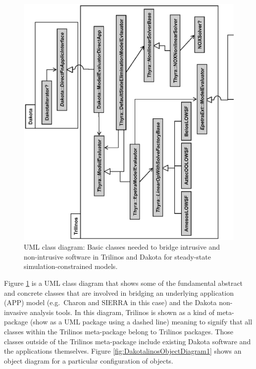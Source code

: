 \documentclass[pdf,ps2pdf,11pt]{SANDreport}
\begin{document}
{\bsinglespace
\begin{figure}
\begin{center}
\includegraphics*[angle=270,scale=0.75
]{DakotalinosClassDiagram}
\end{center}
\caption{
\label{fig:DakotalinosClassDiagram}
UML class diagram: Basic classes needed to bridge intrusive and non-intrusive
software in Trilinos and Dakota for steady-state simulation-constrained
models.}
\end{figure}
\esinglespace}


Figure {}\ref{fig:DakotalinosClassDiagram} is a UML class diagram that shows
some of the fundamental abstract and concrete classes that are involved in
bridging an underlying application (APP) model (e.g.\ Charon and SIERRA in
this case) and the Dakota non-invasive analysis tools.  In this diagram,
Trilinos is shown as a kind of meta-package (show as a UML package using a
dashed line) meaning to signify that all classes within the Trilinos
meta-package belong to Trilinos packages.  Those classes outside of the
Trilinos meta-package include existing Dakota software and the applications
themselves.  Figure {}\ref{fig:DakotalinosObjectDiagram1} shows an object
diagram for a particular configuration of objects.
\end{document}
